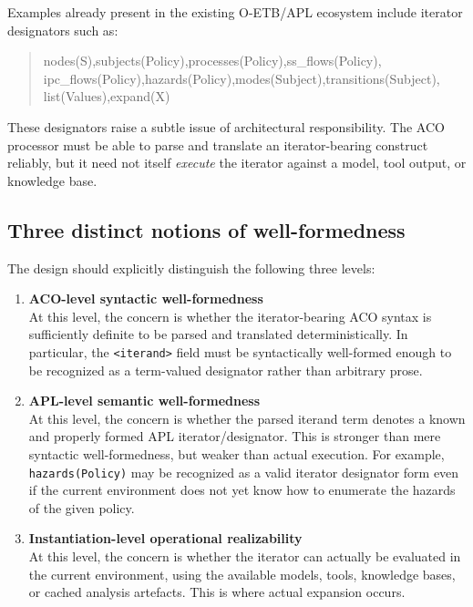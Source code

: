 \documentclass[12pt,twoside,a4paper]{article}
\begin{document}
Examples already present in the existing O-ETB/APL ecosystem include iterator designators such as:
\begin{quote}\ttfamily
nodes(S),\quad subjects(Policy),\quad processes(Policy),\quad ss\_flows(Policy),\\
ipc\_flows(Policy),\quad hazards(Policy),\quad modes(Subject),\quad transitions(Subject),\\
list(Values),\quad expand(X)
\end{quote}

These designators raise a subtle issue of architectural responsibility.
The ACO processor must be able to parse and translate an iterator-bearing construct reliably, but it need not itself \emph{execute} the iterator against a model, tool output, or knowledge base.

\subsection{Three distinct notions of well-formedness}

The design should explicitly distinguish the following three levels:

\begin{enumerate}
  \item \textbf{ACO-level syntactic well-formedness} \\
  At this level, the concern is whether the iterator-bearing ACO syntax is sufficiently definite to be parsed and translated deterministically.
  In particular, the \texttt{<iterand>} field must be syntactically well-formed enough to be recognized as a term-valued designator rather than arbitrary prose.

  \item \textbf{APL-level semantic well-formedness} \\
  At this level, the concern is whether the parsed iterand term denotes a known and properly formed APL iterator/designator.
  This is stronger than mere syntactic well-formedness, but weaker than actual execution.
  For example, \texttt{hazards(Policy)} may be recognized as a valid iterator designator form even if the current environment does not yet know how to enumerate the hazards of the given policy.

  \item \textbf{Instantiation-level operational realizability} \\
  At this level, the concern is whether the iterator can actually be evaluated in the current environment, using the available models, tools, knowledge bases, or cached analysis artefacts.
  This is where actual expansion occurs.
\end{enumerate}
\end{document}
